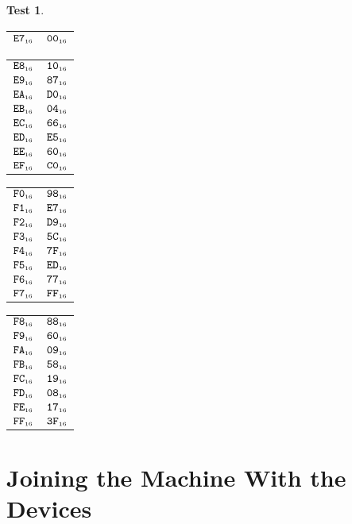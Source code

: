\documentclass[a4paper,12pt]{article}
\makeatletter
\newcommand{\num}[1]{\texttt{#1}}
\newcommand{\hex}[1]{\num{#1}_{\textup{\tiny 16}}}
\newcommand{\MEM}[1]{\ifthenelse{\equal{#1}{}}{M}{M[#1]}}
\theoremstyle{definition}
\newtheorem{test}{Test}
\newenvironment{memtable}{%
  \begin{trivlist}
    \item
    }{%
    \end{trivlist}}
\newenvironment{memcolumn}{%
  \begin{tabular}{@{}ll@{}}
    \hline}
    {%
    \hline
  \end{tabular}}
\newcommand{\memspace}{\qquad}
\makeatother
\begin{document}
\begin{test}
\begin{memtable}
\begin{memcolumn}
      $\hex{E7}$ & $\hex{00}$ \\
    \end{memcolumn}
    \memspace
    \begin{memcolumn}
      $\hex{E8}$ & $\hex{10}$ \\
      $\hex{E9}$ & $\hex{87}$ \\
      $\hex{EA}$ & $\hex{D0}$ \\
      $\hex{EB}$ & $\hex{04}$ \\
      $\hex{EC}$ & $\hex{66}$ \\
      $\hex{ED}$ & $\hex{E5}$ \\
      $\hex{EE}$ & $\hex{60}$ \\
      $\hex{EF}$ & $\hex{C0}$ \\
    \end{memcolumn}
    \memspace
    \begin{memcolumn}
      $\hex{F0}$ & $\hex{98}$ \\
      $\hex{F1}$ & $\hex{E7}$ \\
      $\hex{F2}$ & $\hex{D9}$ \\
      $\hex{F3}$ & $\hex{5C}$ \\
      $\hex{F4}$ & $\hex{7F}$ \\
      $\hex{F5}$ & $\hex{ED}$ \\
      $\hex{F6}$ & $\hex{77}$ \\
      $\hex{F7}$ & $\hex{FF}$ \\
    \end{memcolumn}
    \memspace
    \begin{memcolumn}
      $\hex{F8}$ & $\hex{88}$ \\
      $\hex{F9}$ & $\hex{60}$ \\
      $\hex{FA}$ & $\hex{09}$ \\
      $\hex{FB}$ & $\hex{58}$ \\
      $\hex{FC}$ & $\hex{19}$ \\
      $\hex{FD}$ & $\hex{08}$ \\
      $\hex{FE}$ & $\hex{17}$ \\
      $\hex{FF}$ & $\hex{3F}$ \\
    \end{memcolumn}
  \end{memtable}
\end{test}

\section{Joining the Machine With the Devices}
\label{sec:building-devices}
\end{document}
